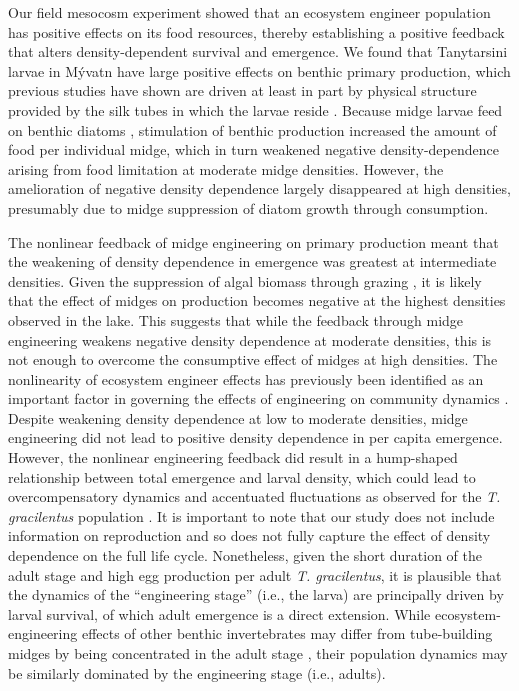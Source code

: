 \documentclass[12pt]{article}
\begin{document}
Our field mesocosm experiment showed that an ecosystem engineer population 
has positive effects on its food resources, 
thereby establishing a positive feedback 
that alters density-dependent survival and emergence. 
We found that Tanytarsini larvae in  M\'{y}vatn have large positive 
effects on benthic primary production,
which previous studies have shown are driven at least in part by physical 
structure provided by the silk tubes in which the larvae reside 
\citep{hoelker2015, phillips2019}.
Because midge larvae feed on benthic diatoms \citep{ingvason2004},
stimulation of benthic production increased the amount of food per individual midge,
which in turn weakened negative density-dependence arising from food limitation
at moderate midge densities.
However, the amelioration of negative density dependence largely disappeared at high densities,
presumably due to midge suppression of diatom growth through consumption.

The nonlinear feedback of midge engineering on primary production meant 
that the weakening of density dependence in emergence was greatest at intermediate densities. 
Given the suppression of algal biomass through grazing \citep{einarsson2016},
it is likely that the effect of midges on production becomes negative
at the highest densities observed in the lake.
This suggests that while the feedback through midge engineering weakens 
negative density dependence at moderate densities, 
this is not enough to overcome the consumptive effect of midges at high densities. 
The nonlinearity of ecosystem engineer effects has previously been identified 
as an important factor in governing the effects of engineering on community dynamics 
\citep{bozec2013}.
Despite weakening density dependence at low to moderate densities,
midge engineering did not lead to positive density dependence in per capita emergence.
However, the nonlinear engineering feedback did result in a hump-shaped relationship
between total emergence and larval density, 
which could lead to overcompensatory dynamics and accentuated fluctuations as observed
for the \textit{T. gracilentus} population
\citep{turchin2003, cuddington2009}.
It is important to note that our study does not include information on reproduction
and so does not fully capture the effect of density  dependence on the full life cycle.
Nonetheless, given the short duration of the adult stage and high egg production per adult 
\textit{T. gracilentus}, 
it is plausible that the dynamics of the ``engineering stage'' (i.e., the larva)
are principally driven by larval survival, of which adult emergence is a direct extension.
While ecosystem-engineering effects of other benthic invertebrates may differ from 
tube-building midges by being concentrated in the adult stage 
\citep[e.g., mussels;][]{largaespada2012},
their population dynamics may be similarly dominated by the
engineering stage (i.e., adults).
\end{document}
